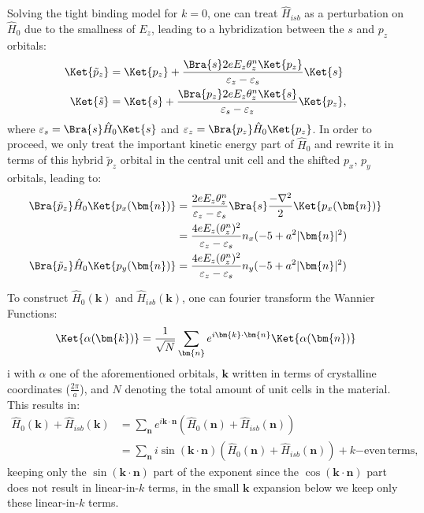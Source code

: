 Solving the tight binding model for $k=0$, one can treat $\hat{H}_{isb}$ as a perturbation on $\hat{H}_0$ due to the smallness of $E_z$, leading to a hybridization between the $s$ and $p_z$ orbitals:
\begin{align}
	\Ket{\tilde{p}_z} &= \Ket{p_z} + \frac{\Bra{s} 2 e E_z \theta^n_z\Ket{p_z}}{\varepsilon_z - \varepsilon_s}\Ket{s}\\
	\Ket{\tilde{s}}   &= \Ket{s} + \frac{\Bra{p_z} 2 e E_z \theta^n_z\Ket{s}}{\varepsilon_s - \varepsilon_z}\Ket{p_z},
\end{align}
where $\varepsilon_s = \Bra{s} \hat{H}_0 \Ket{s}$ and $\varepsilon_z = \Bra{p_z} \hat{H}_0 \Ket{p_z}$.
In order to proceed, we only treat the important kinetic energy part of $\hat{H}_0$ and rewrite it in terms of this hybrid $\tilde{p}_z$ orbital in the central unit cell and the shifted $p_x$, $p_y$ orbitals, leading to:
\begin{align}
	\Bra{\tilde{p}_z} \hat{H}_0 \Ket{p_x(\bm{n})} &= \frac{2 e E_z \theta_z^n}{\varepsilon_z - \varepsilon_s}\Bra{s} \frac{-\mathbf{\nabla}^2}{2} \Ket{p_x(\bm{n})}\\
	&= \frac{4 e E_z (\theta_z^n)^2}{\varepsilon_z - \varepsilon_s} n_x (-5 + a^2 |\bm{n}|^2)\\
	\Bra{\tilde{p}_z} \hat{H}_0 \Ket{p_y(\bm{n})} &= \frac{4 e E_z (\theta_z^n)^2}{\varepsilon_z - \varepsilon_s} n_y (-5 + a^2 |\bm{n}|^2)
\end{align}

To construct $\hat{H}_0(\bm{k})$ and $\hat{H}_{isb}(\bm{k})$, one can fourier transform the Wannier Functions:
\begin{equation}
	\Ket{\alpha(\bm{k})} = \frac{1}{\sqrt{N}}\sum_{\bm{n}} e^{i \bm{k}\cdot \bm{n}}\Ket{\alpha(\bm{n})}
\end{equation}i
with $\alpha$ one of the aforementioned orbitals, $\bm{k}$ written in terms of crystalline coordinates ($\frac{2\pi}{a}$), and $N$ denoting the total amount of unit cells in the material. This results in:
\begin{align}
	\hat{H}_0(\bm{k}) + \hat{H}_{isb}(\bm{k}) &= \sum_{\bm{n}} e^{i \bm{k}\cdot \bm{n}}(\hat{H}_0(\bm{n}) + \hat{H}_{isb}(\bm{n}))\\
	&= \sum_{\bm{n}} i \sin(\bm{k}\cdot \bm{n})(\hat{H}_0(\bm{n}) + \hat{H}_{isb}(\bm{n})) + k\mathrm{-even\,terms},
\end{align}
keeping only the $\sin(\bm{k}\cdot\bm{n})$ part of the exponent since the $\cos(\bm{k}\cdot\bm{n})$ part does not result in linear-in-$k$ terms, in the small $\bm{k}$ expansion below we keep only these linear-in-$k$ terms.

